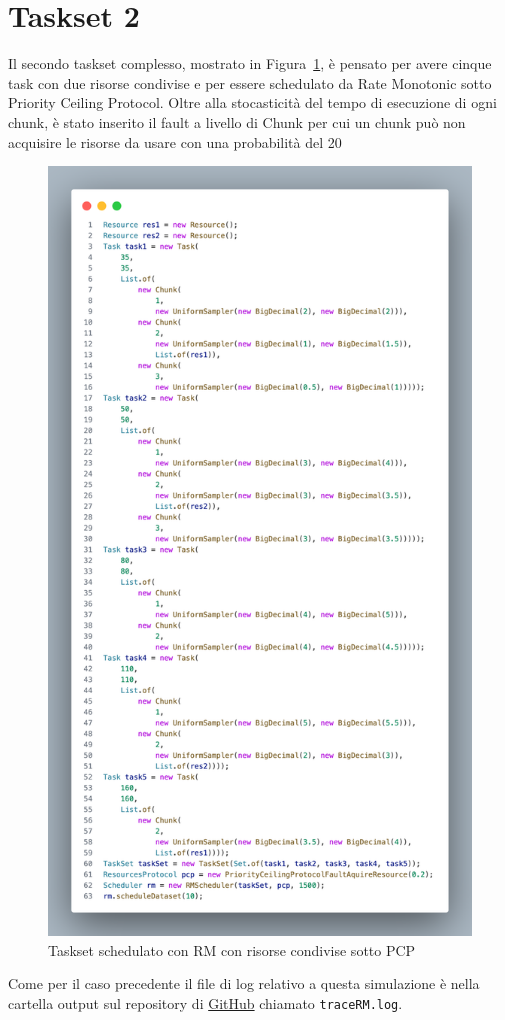 \section{Taskset 2}
Il secondo taskset complesso, mostrato in Figura~\ref{fig:datasetRM}, è pensato per avere cinque task con due risorse condivise e per essere schedulato da Rate Monotonic sotto Priority Ceiling Protocol. Oltre alla stocasticità del tempo di esecuzione di ogni chunk, è stato inserito il fault a livello di Chunk per cui un chunk può non acquisire le risorse da usare con una probabilità del 20%

\begin{figure}[htbp]
\includegraphics[width=.5\textwidth]{immagini/datasetRM.pdf}
\centering
\caption{Taskset schedulato con RM con risorse condivise sotto PCP}
\label{fig:datasetRM}

\end{figure}
Come per il caso precedente il file di log relativo a questa simulazione è nella cartella output sul repository di \href{https://github.com/edoardosarri24/real-time-scheduling-simulator.git}{GitHub} chiamato \texttt{traceRM.log}.